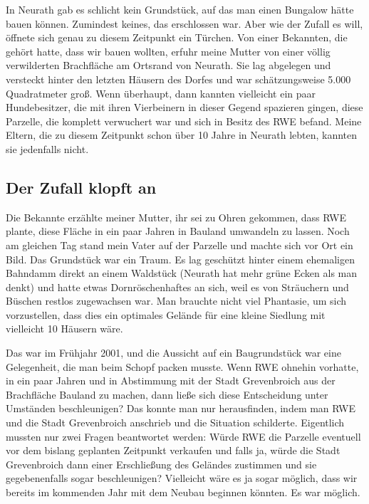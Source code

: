 \documentclass[fontsize=14pt,a4paper,headinclude,DIV=calc,automark]{scrbook}
\begin{document}
In Neurath gab es schlicht kein Grundstück, auf das man einen Bungalow hätte bauen können. Zumindest keines, das erschlossen war. Aber wie der Zufall es will, öffnete sich genau zu diesem Zeitpunkt ein Türchen. Von einer Bekannten, die gehört hatte, dass wir bauen wollten, erfuhr meine Mutter von einer völlig verwilderten Brachfläche am Ortsrand von Neurath. Sie lag abgelegen und versteckt hinter den letzten Häusern des Dorfes und war schätzungsweise 5.000 Quadratmeter groß. Wenn überhaupt, dann kannten vielleicht ein paar Hundebesitzer, die mit ihren Vierbeinern in dieser Gegend spazieren gingen, diese Parzelle, die komplett verwuchert war und sich in Besitz des RWE befand. Meine Eltern, die zu diesem Zeitpunkt schon über 10 Jahre in Neurath lebten, kannten sie jedenfalls nicht.

\subsection{Der Zufall klopft an}

Die Bekannte erzählte meiner Mutter, ihr sei zu Ohren gekommen, dass RWE plante, diese Fläche in ein paar Jahren in Bauland umwandeln zu lassen. Noch am gleichen Tag stand mein Vater auf der Parzelle und machte sich vor Ort ein Bild. Das Grundstück war ein Traum. Es lag geschützt hinter einem ehemaligen Bahndamm direkt an einem Waldstück (Neurath hat mehr grüne Ecken als man denkt) und hatte etwas Dornröschenhaftes an sich, weil es von Sträuchern und Büschen restlos zugewachsen war. Man brauchte nicht viel Phantasie, um sich vorzustellen, dass dies ein optimales Gelände für eine kleine Siedlung mit vielleicht 10 Häusern wäre.

Das war im Frühjahr 2001, und die Aussicht auf ein Baugrundstück war eine Gelegenheit, die man beim Schopf packen musste. Wenn RWE ohnehin vorhatte, in ein paar Jahren und in Abstimmung mit der Stadt Grevenbroich aus der Brachfläche Bauland zu machen, dann ließe sich diese Entscheidung unter Umständen beschleunigen? Das konnte man nur herausfinden, indem man RWE und die Stadt Grevenbroich anschrieb und die Situation schilderte. Eigentlich mussten nur zwei Fragen beantwortet werden: Würde RWE die Parzelle eventuell vor dem bislang geplanten Zeitpunkt verkaufen und falls ja, würde die Stadt Grevenbroich dann einer Erschließung des Geländes zustimmen und sie gegebenenfalls sogar beschleunigen? Vielleicht wäre es ja sogar möglich, dass wir bereits im kommenden Jahr mit dem Neubau beginnen könnten. Es war möglich.
\end{document}
